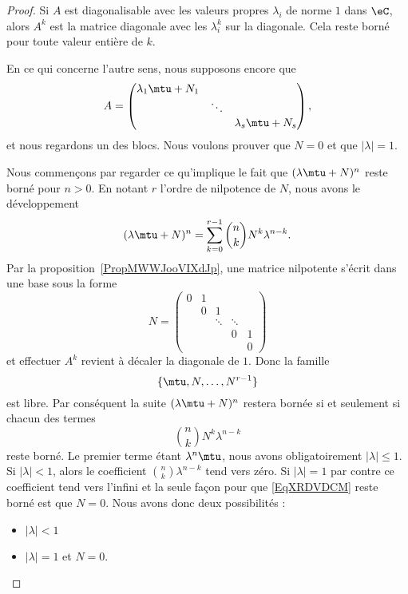 \begin{proof}
    Si \( A\) est diagonalisable avec les valeurs propres \( \lambda_i\) de norme \( 1\) dans \( \eC\), alors \( A^k\) est la matrice diagonale avec les \( \lambda_i^k\) sur la diagonale. Cela reste borné pour toute valeur entière de \( k\).

    En ce qui concerne l'autre sens, nous supposons encore que
    \begin{equation}
        A=\begin{pmatrix}
            \lambda_1\mtu+N_1    &       &       \\
                &   \ddots    &       \\
                &       &   \lambda_s\mtu+N_s
        \end{pmatrix},
    \end{equation}
    et nous regardons un des blocs. Nous voulons prouver que \( N=0\) et que \( | \lambda |=1\).

    Nous commençons par regarder ce qu'implique le fait que \( (\lambda \mtu+N)^n\) reste borné pour \( n>0\). En notant \( r\) l'ordre de nilpotence de \( N\), nous avons le développement
    \begin{equation}
        (\lambda\mtu+N)^n=\sum_{k=0}^{r-1}\binom{ n }{ k }N^k\lambda^{n-k}.
    \end{equation}
    Par la proposition~\ref{PropMWWJooVIXdJp}, une matrice nilpotente s'écrit dans une base sous la forme
    \begin{equation}
        N=\begin{pmatrix}
             0   &   1    &       &       \\
                &   0    &   1    &       \\
                & &   \ddots   &   \ddots    &      \\
                &&       &   0    &   1     \\
                &&       &      &   0
         \end{pmatrix}
    \end{equation}
    et effectuer \( A^k\) revient à décaler la diagonale de \( 1\). Donc la famille
    \begin{equation}
        \{ \mtu,N,\ldots, N^{r-1} \}
    \end{equation}
    est libre. Par conséquent la suite \( (\lambda\mtu+N)^n\) restera bornée si et seulement si chacun des termes
    \begin{equation}    \label{EqXRDVDCM}
        \binom{ n }{ k }N^k\lambda^{n-k}
    \end{equation}
    reste borné. Le premier terme étant \( \lambda^n\mtu\), nous avons obligatoirement \( | \lambda |\leq 1\). Si \( | \lambda |<1\), alors le coefficient \( \binom{ n }{ k }\lambda^{n-k}\) tend vers zéro. Si \( | \lambda |=1\) par contre ce coefficient tend vers l'infini et la seule façon pour que \eqref{EqXRDVDCM} reste borné est que \( N=0\). Nous avons donc deux possibilités :
    \begin{itemize}
        \item \( | \lambda |<1\)
        \item \( | \lambda |=1\) et \( N=0\).
    \end{itemize}


\end{proof}
